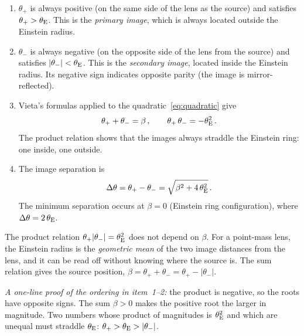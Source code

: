 \begin{enumerate}
    \item $\theta_+$ is always positive (on the same side of the
          lens as the source) and satisfies $\theta_+ > \theta_{\mathrm{E}}$.  This
          is the \emph{primary image}, which is always located
          outside the Einstein radius.

    \item $\theta_-$ is always negative (on the opposite side
          of the lens from the source) and satisfies
          $|\theta_-| < \theta_{\mathrm{E}}$.  This is the \emph{secondary image},
          located inside the Einstein radius.  Its negative sign
          indicates opposite parity (the image is mirror-reflected).

    \item Vieta's formulas applied to
          the quadratic~\eqref{eq:quadratic} give
          \begin{equation}
              \theta_+ + \theta_- = \beta \,, \qquad
              \theta_+\, \theta_- = -\theta_{\mathrm{E}}^2 \,.
              \label{eq:vieta}
          \end{equation}
          The product relation shows that the images always straddle the
          Einstein ring: one inside, one outside.

    \item The image separation is
          \begin{equation}
              \Delta\theta = \theta_+ - \theta_-
              = \sqrt{\beta^2 + 4\,\theta_{\mathrm{E}}^2} \,.
              \label{eq:image_separation}
          \end{equation}
          The minimum separation occurs at $\beta = 0$
          (Einstein ring configuration), where $\Delta\theta = 2\,\theta_{\mathrm{E}}$.
\end{enumerate}
\begin{annotation}
The product relation $\theta_+|\theta_-| = \theta_{\mathrm{E}}^2$ does not depend on
$\beta$. For a point-mass lens, the Einstein radius is the
\emph{geometric mean} of the two image distances from the lens, and it can be read
off without knowing where the source is. The sum relation gives the source
position, $\beta = \theta_+ + \theta_- = \theta_+ - |\theta_-|$.

\emph{A one-line proof of the ordering in item~1--2:} the product is
negative, so the roots have opposite signs. The sum $\beta > 0$ makes the
positive root the larger in magnitude. Two numbers whose product of magnitudes
is $\theta_{\mathrm{E}}^2$ and which are unequal must straddle $\theta_{\mathrm{E}}$:
$\theta_+ > \theta_{\mathrm{E}} > |\theta_-|$.
\end{annotation}


